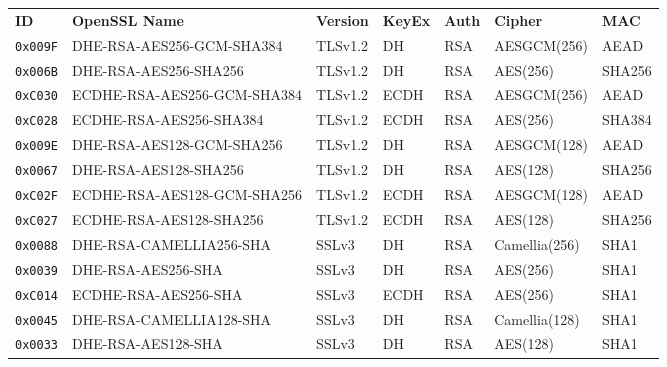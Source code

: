 \begin{center}
\begin{tabular}{lllllll}
\toprule
\textbf{ID}   & \textbf{OpenSSL Name}       & \textbf{Version} & \textbf{KeyEx} & \textbf{Auth} & \textbf{Cipher} & \textbf{MAC}\\\cmidrule(lr){1-7}
\verb|0x009F| & DHE-RSA-AES256-GCM-SHA384   & TLSv1.2          & DH             & RSA           & AESGCM(256)     & AEAD         \\
\verb|0x006B| & DHE-RSA-AES256-SHA256       & TLSv1.2          & DH             & RSA           & AES(256)        & SHA256       \\
\verb|0xC030| & ECDHE-RSA-AES256-GCM-SHA384 & TLSv1.2          & ECDH           & RSA           & AESGCM(256)     & AEAD         \\
\verb|0xC028| & ECDHE-RSA-AES256-SHA384     & TLSv1.2          & ECDH           & RSA           & AES(256)        & SHA384       \\
\verb|0x009E| & DHE-RSA-AES128-GCM-SHA256   & TLSv1.2          & DH             & RSA           & AESGCM(128)     & AEAD         \\
\verb|0x0067| & DHE-RSA-AES128-SHA256       & TLSv1.2          & DH             & RSA           & AES(128)        & SHA256       \\
\verb|0xC02F| & ECDHE-RSA-AES128-GCM-SHA256 & TLSv1.2          & ECDH           & RSA           & AESGCM(128)     & AEAD         \\
\verb|0xC027| & ECDHE-RSA-AES128-SHA256     & TLSv1.2          & ECDH           & RSA           & AES(128)        & SHA256       \\
\verb|0x0088| & DHE-RSA-CAMELLIA256-SHA     & SSLv3            & DH             & RSA           & Camellia(256)   & SHA1         \\
\verb|0x0039| & DHE-RSA-AES256-SHA          & SSLv3            & DH             & RSA           & AES(256)        & SHA1         \\
\verb|0xC014| & ECDHE-RSA-AES256-SHA        & SSLv3            & ECDH           & RSA           & AES(256)        & SHA1         \\
\verb|0x0045| & DHE-RSA-CAMELLIA128-SHA     & SSLv3            & DH             & RSA           & Camellia(128)   & SHA1         \\
\verb|0x0033| & DHE-RSA-AES128-SHA          & SSLv3            & DH             & RSA           & AES(128)        & SHA1         \\

\end{tabular}
\end{center}
